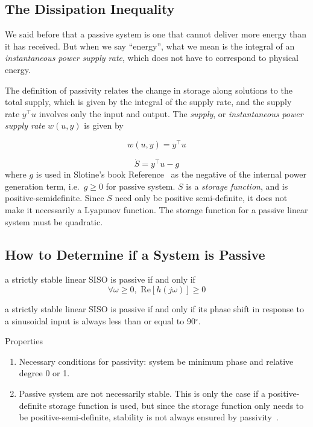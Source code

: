 \subsection{The Dissipation Inequality}

We said before that a passive system is one that cannot deliver more energy than it has received.
But when we say ``energy'', what we mean is the integral of an \textit{instantaneous power supply rate}, which does not have to correspond to physical energy.

The definition of passivity relates the change in storage along solutions to the total supply, which is given by the integral of the supply rate, and the supply rate $y^{\top}u$ involves only the input and output.
The \textit{supply}, or \textit{instantaneous power supply rate} $w(u,y)$ is given by

\begin{equation*}
  w(u,y)=y^{\top}u
\end{equation*}

\begin{equation*}
  \dot{S}=y^{\top}u-g
\end{equation*}
where $g$ is used in Slotine's book Reference~\cite{slotine.appliednonlinear.1991} as the negative of the internal power generation term, i.e.\ $g\geq0$ for passive system.
$S$ is a \textit{storage function}, and is positive-semidefinite.
Since $S$ need only be positive semi-definite, it does not make it necessarily a Lyapunov function.
The storage function for a passive linear system must be quadratic.

\subsection{How to Determine if a System is Passive}

\begin{defn-dan}
  a strictly stable linear SISO is passive if and only if
  \begin{equation*}
    \forall\omega\geq 0, \text{~Re}[h(j\omega)]\geq0
  \end{equation*}
\end{defn-dan}

\begin{defn-dan}
  a strictly stable linear SISO is passive if and only if its phase shift in response to a sinusoidal input is always less than or equal to 90$^{\circ}$.
\end{defn-dan}

Properties
\begin{enumerate}
  \item{Necessary conditions for passivity: system be minimum phase and relative degree 0 or 1.}
  \item{%
    Passive system are not necessarily stable.
    This is only the case if a positive-definite storage function is used, but since the storage function only needs to be positive-semi-definite, stability is not always ensured by passivity~\cite{bao.process.2007}.
  }
\end{enumerate}

